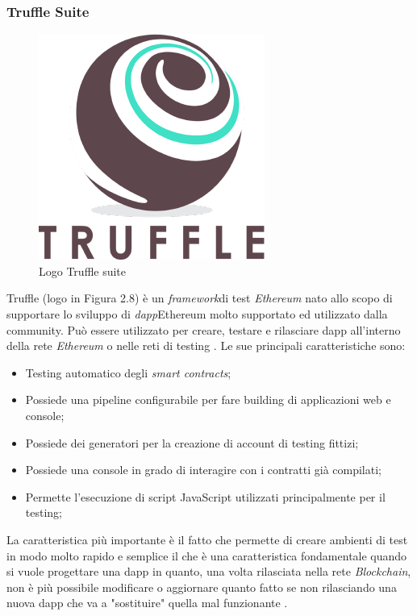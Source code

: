 \subsubsection{Truffle Suite}
\begin{figure}[h]
	\centering
	\includegraphics[scale=0.3]{immagini/truffle}
	\caption{Logo Truffle suite}
\end{figure}
Truffle (logo in Figura 2.8) è un \emph{\gls{framework}}\glsfirstoccur  di test \textit{Ethereum} nato allo scopo di supportare lo sviluppo di \emph{\gls{dapp}}\glsfirstoccur  Ethereum molto supportato ed utilizzato dalla community.
Può essere utilizzato per creare, testare e rilasciare \gls{dapp} all'interno della rete \textit{Ethereum} o nelle reti di testing \cite{truffle}.
Le sue principali caratteristiche sono:
\begin{itemize}
	\item Testing automatico degli \textit{smart contracts};
	\item Possiede una pipeline configurabile per fare building di applicazioni web e console;
	\item Possiede dei generatori per la creazione di account di testing fittizi;
	\item Possiede una console in grado di interagire con i contratti già compilati;
	\item Permette l'esecuzione di script JavaScript utilizzati principalmente per il testing;
\end{itemize}
La caratteristica più importante è il fatto che permette di creare ambienti di test in modo molto rapido e semplice il che è una caratteristica fondamentale quando si vuole progettare una \gls{dapp} in quanto, una volta rilasciata nella rete \textit{Blockchain}, non è più possibile modificare o aggiornare quanto fatto se non rilasciando una nuova \gls{dapp} che va a "sostituire" quella mal funzionante \cite{truffle}.
